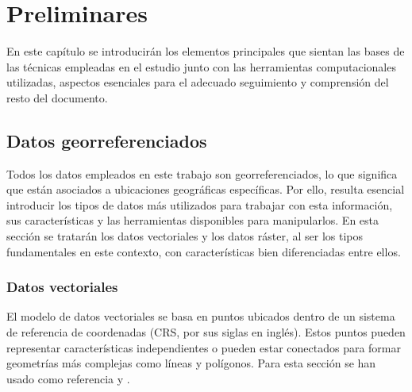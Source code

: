 \documentclass[12pt,a4paper,]{book}
\title{}
\author{Nombre Completo Autor}
\date{18/11/2021}
\def\ifdoblecara{} %
\def\ifprincipal{} %
\let\ifprincipal\undefined %
\numberwithin{dummy}{section}
\theoremstyle{ocrenumbox}
\theoremstyle{blacknumex}
\theoremstyle{blacknumbox}
\theoremstyle{ocrenum}
\theoremstyle{ocrenum}
\begin{document}




\raggedbottom

\ifdefined\ifprincipal
\else
\setlength{\parindent}{1em}
\pagestyle{fancy}
\setcounter{tocdepth}{4}
\tableofcontents

\fi

\ifdefined\ifdoblecara
\fancyhead{}{}
\fancyhead[LE,RO]{\scriptsize\rightmark}
\fancyfoot[LO,RE]{\scriptsize\slshape \leftmark}
\fancyfoot[C]{}
\fancyfoot[LE,RO]{\footnotesize\thepage}
\else
\fancyhead{}{}
\fancyhead[RO]{\scriptsize\rightmark}
\fancyfoot[LO]{\scriptsize\slshape \leftmark}
\fancyfoot[C]{}
\fancyfoot[RO]{\footnotesize\thepage}
\fi

\renewcommand{\headrulewidth}{0.4pt}
\renewcommand{\footrulewidth}{0.4pt}

\hypertarget{preliminares}{%
\chapter{Preliminares}\label{preliminares}}

En este capítulo se introducirán los elementos principales que sientan
las bases de las técnicas empleadas en el estudio junto con las
herramientas computacionales utilizadas, aspectos esenciales para el
adecuado seguimiento y comprensión del resto del documento.

\hypertarget{datos-georreferenciados}{%
\section{Datos georreferenciados}\label{datos-georreferenciados}}

Todos los datos empleados en este trabajo son georreferenciados, lo que
significa que están asociados a ubicaciones geográficas específicas. Por
ello, resulta esencial introducir los tipos de datos más utilizados para
trabajar con esta información, sus características y las herramientas
disponibles para manipularlos. En esta sección se tratarán los datos
vectoriales y los datos ráster, al ser los tipos fundamentales en este
contexto, con características bien diferenciadas entre ellos.

\hypertarget{datos-vectoriales}{%
\subsection{Datos vectoriales}\label{datos-vectoriales}}

El modelo de datos vectoriales se basa en puntos ubicados dentro de un
sistema de referencia de coordenadas (CRS, por sus siglas en inglés).
Estos puntos pueden representar características independientes o pueden
estar conectados para formar geometrías más complejas como líneas y
polígonos. Para esta sección se han usado como referencia
\citep{lovelace_geocomputation_2019} y \citep{introGISGimond}.
\end{document}
